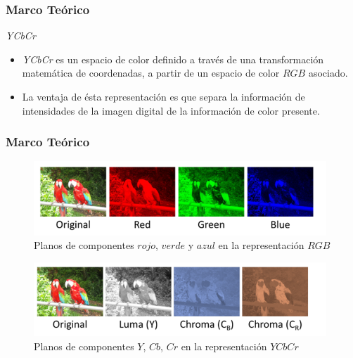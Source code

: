 \documentclass[usenames,dvipsnames]{beamer}
\begin{document}
\begin{frame} 
\frametitle{Marco Teórico} 
\begin{exampleblock}{\textit{YCbCr}}
\begin{itemize}
\item \textit{YCbCr} es un espacio de color definido a través de una transformación matemática de coordenadas, a partir de un espacio de color $RGB$ asociado.

\item La ventaja de ésta representación es que separa la información de intensidades de la imagen digital de la información de color presente.
\end{itemize}
\end{exampleblock}

\centering

\end{frame}

\begin{frame} 
\frametitle{Marco Teórico} 
\vspace{-1cm}
\begin{figure}
  \includegraphics[width=11cm]{graphics/IC676790.png}
  \caption{Planos de componentes $rojo$, $verde$ y $azul$ en la representación $RGB$}
\end{figure}
\vspace{-1cm}
\begin{figure}
  \includegraphics[width=11cm]{graphics/IC676791.png}
  \caption{Planos de componentes $Y$, $Cb$, $Cr$ en la representación $YCbCr$}
\end{figure}


\end{frame}
\end{document}
